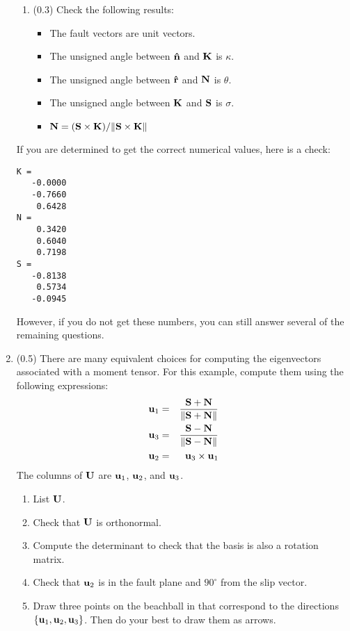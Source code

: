 \documentclass[11pt,titlepage,fleqn]{article}
\begin{document}
\begin{enumerate}
\begin{enumerate}
\item (0.3) Check the following results:
%
\begin{itemize}
\item The fault vectors are unit vectors.
\item The unsigned angle between $\mbox{\boldmath{$\hat{\rm n}$}}$ and $\mbox{${\bf K}$}$ is $\kappa$.
\item The unsigned angle between $\mbox{\boldmath{$\hat{\rm r}$}}$ and $\mbox{${\bf N}$}$ is $\theta$.
\item The unsigned angle between $\mbox{${\bf K}$}$ and $\mbox{${\bf S}$}$ is $\sigma$.
\item $\mbox{${\bf N}$} = (\mbox{${\bf S}$} \times \mbox{${\bf K}$})/\| \mbox{${\bf S}$} \times \mbox{${\bf K}$} \|$
\end{itemize}

\end{enumerate}
%
If you are determined to get the correct numerical values, here is a check:
%
\begin{verbatim}
K =
   -0.0000
   -0.7660
    0.6428
N =
    0.3420
    0.6040
    0.7198
S =
   -0.8138
    0.5734
   -0.0945
\end{verbatim}
%
However, if you do not get these numbers, you can still answer several of the remaining questions.


\item (0.5) There are many equivalent choices for computing the eigenvectors associated with a moment tensor. For this example, compute them using the following expressions:
%
\begin{eqnarray*}
\mbox{${\bf u}$}_1 &=& \frac{\mbox{${\bf S}$} + \mbox{${\bf N}$}}{\| \mbox{${\bf S}$} + \mbox{${\bf N}$} \|}
\\
\mbox{${\bf u}$}_3 &=& \frac{\mbox{${\bf S}$} - \mbox{${\bf N}$}}{\| \mbox{${\bf S}$} - \mbox{${\bf N}$} \|}
\\
\mbox{${\bf u}$}_2 &=& \mbox{${\bf u}$}_3  \times \mbox{${\bf u}$}_1
\end{eqnarray*}
%
The columns of $\mbox{${\bf U}$}$ are $\mbox{${\bf u}$}_1$, $\mbox{${\bf u}$}_2$, and $\mbox{${\bf u}$}_3$.
%
\begin{enumerate}
\item List $\mbox{${\bf U}$}$.
\item Check that $\mbox{${\bf U}$}$ is orthonormal.
\item Compute the determinant to check that the basis is also a rotation matrix.
\item Check that $\mbox{${\bf u}$}_2$ is in the fault plane and $90^\circ$ from the slip vector.
\item Draw three points on the beachball in  that correspond to the directions $\{\mbox{${\bf u}$}_1,\mbox{${\bf u}$}_2,\mbox{${\bf u}$}_3\}$. Then do your best to draw them as arrows.
\end{enumerate}


\end{enumerate}
\end{document}
